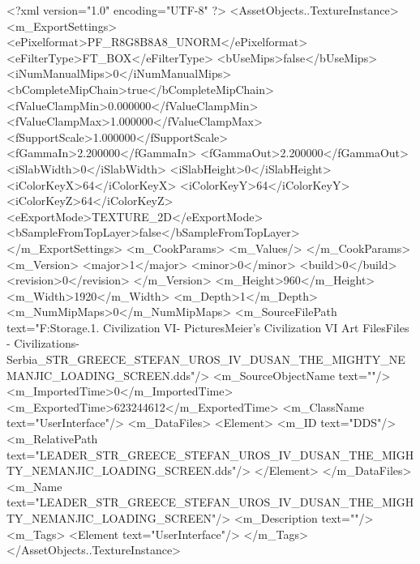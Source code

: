 <?xml version="1.0" encoding="UTF-8" ?>
<AssetObjects..TextureInstance>
	<m_ExportSettings>
		<ePixelformat>PF_R8G8B8A8_UNORM</ePixelformat>
		<eFilterType>FT_BOX</eFilterType>
		<bUseMips>false</bUseMips>
		<iNumManualMips>0</iNumManualMips>
		<bCompleteMipChain>true</bCompleteMipChain>
		<fValueClampMin>0.000000</fValueClampMin>
		<fValueClampMax>1.000000</fValueClampMax>
		<fSupportScale>1.000000</fSupportScale>
		<fGammaIn>2.200000</fGammaIn>
		<fGammaOut>2.200000</fGammaOut>
		<iSlabWidth>0</iSlabWidth>
		<iSlabHeight>0</iSlabHeight>
		<iColorKeyX>64</iColorKeyX>
		<iColorKeyY>64</iColorKeyY>
		<iColorKeyZ>64</iColorKeyZ>
		<eExportMode>TEXTURE_2D</eExportMode>
		<bSampleFromTopLayer>false</bSampleFromTopLayer>
	</m_ExportSettings>
	<m_CookParams>
		<m_Values/>
	</m_CookParams>
	<m_Version>
		<major>1</major>
		<minor>0</minor>
		<build>0</build>
		<revision>0</revision>
	</m_Version>
	<m_Height>960</m_Height>
	<m_Width>1920</m_Width>
	<m_Depth>1</m_Depth>
	<m_NumMipMaps>0</m_NumMipMaps>
	<m_SourceFilePath text="F:\Mod Storage\2.1. Civilization VI\Mods\Archive - Pictures\Sid Meier's Civilization VI Art Files\Art Files - Civilizations\Civilization - Serbia\LEADER_STR_GREECE_STEFAN_UROS_IV_DUSAN_THE_MIGHTY_NEMANJIC_LOADING_SCREEN.dds"/>
	<m_SourceObjectName text=""/>
	<m_ImportedTime>0</m_ImportedTime>
	<m_ExportedTime>623244612</m_ExportedTime>
	<m_ClassName text="UserInterface"/>
	<m_DataFiles>
		<Element>
			<m_ID text="DDS"/>
			<m_RelativePath text="LEADER_STR_GREECE_STEFAN_UROS_IV_DUSAN_THE_MIGHTY_NEMANJIC_LOADING_SCREEN.dds"/>
		</Element>
	</m_DataFiles>
	<m_Name text="LEADER_STR_GREECE_STEFAN_UROS_IV_DUSAN_THE_MIGHTY_NEMANJIC_LOADING_SCREEN"/>
	<m_Description text=""/>
	<m_Tags>
		<Element text="UserInterface"/>
	</m_Tags>
</AssetObjects..TextureInstance>

